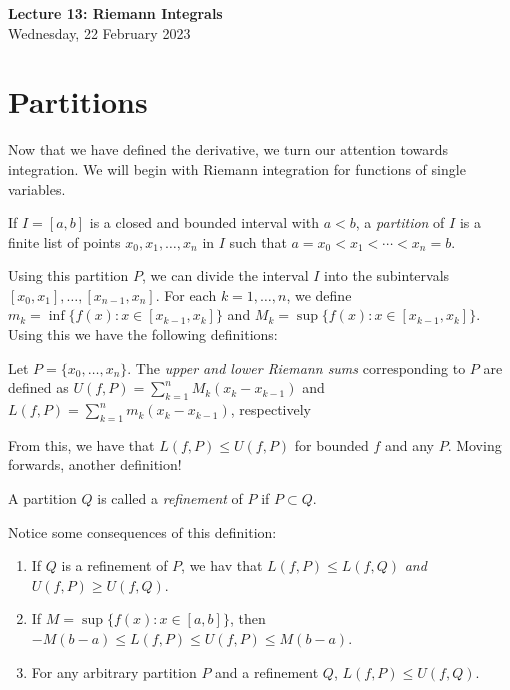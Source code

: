 \documentclass[11pt]{article}
\theoremstyle{definition}
\begin{document}
\thispagestyle{empty}

\begin{center}
{\LARGE \bf Lecture 13: Riemann Integrals}\\
{\large Wednesday, 22 February 2023}\\

\end{center}
\section{Partitions}
Now that we have defined the derivative, we turn our attention towards integration. We will begin with Riemann integration for functions of single variables.

\begin{mdframed}[backgroundcolor = blue!10]
\vspace{+0.2cm}
 If $I=[a,b]$ is a closed and bounded interval with $a<b$, a \textit{partition} of $I$ is a finite list of points $x_0,x_1,\dots,x_n$ in $I$ such that $a=x_0<x_1<\cdots<x_n=b$.
\end{mdframed}

Using this partition $P$, we can divide the interval $I$ into the subintervals $[x_0,x_1],\dots,[x_{n-1},x_n]$. For each $k=1,\dots,n$, we define $m_k=\inf\{f(x):x\in[x_{k-1},x_k]\}$ and $M_k=\sup\{f(x):x\in[x_{k-1},x_k]\}$. Using this we have the following definitions:

\begin{mdframed}[backgroundcolor = blue!10]
\vspace{+0.2cm}
 Let $P=\{x_0,\dots,x_n\}$. The \textit{upper and lower Riemann sums} corresponding to $P$ are defined as $U(f,P)=\sum_{k=1}^n M_k(x_k-x_{k-1})$ and $L(f,P)=\sum_{k=1}^n m_k(x_k-x_{k-1})$, respectively
\end{mdframed}

\note From this, we have that $L(f,P)\leq U(f,P)$ for bounded $f$ and any $P$. Moving forwards, another definition!

\begin{mdframed}[backgroundcolor = blue!10]
\vspace{+0.2cm}
 A partition $Q$ is called a \textit{refinement} of $P$ if $P\subset Q$.
\end{mdframed}
\note Notice some consequences of this definition:
\begin{enumerate}
    \item If $Q$ is a refinement of $P$, we hav that $L(f,P)\leq L(f,Q)$ \textit{and} $U(f,P)\geq U(f,Q)$.
    \item If $M=\sup\{f(x):x\in[a,b]\}$, then $-M(b-a)\leq L(f,P)\leq U(f,P)\leq M(b-a)$.
    \item For any arbitrary partition $P$ and a refinement $Q$, $L(f,P)\leq U(f,Q)$.
\end{enumerate}
\end{document}

